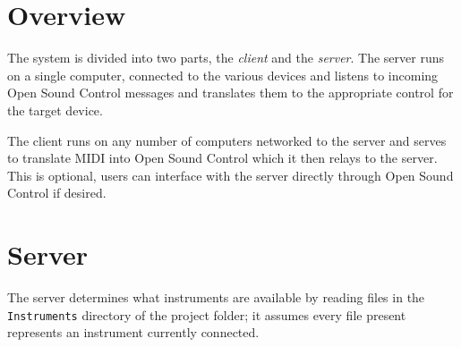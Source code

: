 \documentclass{article}
\begin{document}
\section{Overview}
The system is divided into two parts, the {\em client} and the {\em server}. The server runs on a single computer, connected to the various devices and listens to incoming Open Sound 
Control messages and translates them to the appropriate control for the target device. 

The client runs on any number of computers networked to the server and serves to translate MIDI into Open Sound Control which it then relays to the server. This is optional, users
can interface with the server directly through Open Sound Control if desired.

\section{Server}
The server determines what instruments are available by reading files in the \texttt{Instruments} directory of the project folder; it assumes every file present represents an instrument
currently connected.
\end{document}
